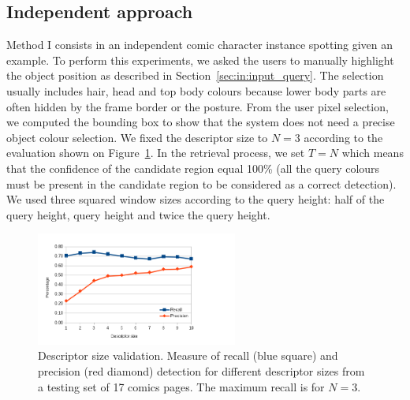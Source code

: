 

\subsection{Independent approach} %
\label{sub:ex:character_extraction_method_b}

Method I consists in an independent comic character instance spotting given an example.
To perform this experiments, we asked the users to manually highlight the object position as described in Section~\ref{sec:in:input_query}.
The selection usually includes hair, head and top body colours because lower body parts are often hidden by the frame border or the posture. 
From the user pixel selection, we computed the bounding box to show that the system does not need a precise object colour selection. 
We fixed the descriptor size to $N=3$ according to the evaluation shown on Figure~\ref{fig:ex:descriptor_size_evaluation}.
In the retrieval process, we set $T=N$ which means that the confidence of the candidate region equal 100\% (all the query colours must be present in the candidate region to be considered as a correct detection).
We used three squared window sizes according to the query height: half of the query height, query height and twice the query height.


 \begin{figure}[!ht]  %
   \centering
  \includegraphics[trim= 5mm 0mm 30mm 0mm, clip, width=250px]{descriptor_size_evaluation.png}
  \caption[Character spotting descriptor size validation]{Descriptor size validation. Measure of recall (blue square) and precision (red diamond) detection for different descriptor sizes from a testing set of 17 comics pages. The maximum recall is for $N=3$.}
  \label{fig:ex:descriptor_size_evaluation}
 \end{figure}


